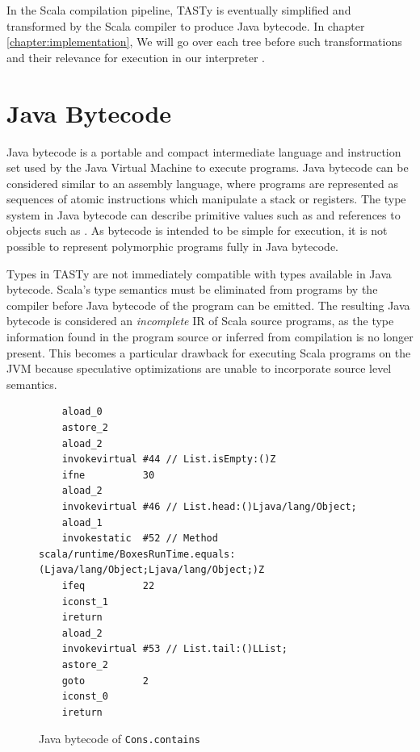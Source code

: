 In the Scala compilation pipeline, TASTy is eventually simplified and transformed by the Scala compiler to produce Java bytecode. 
In chapter \ref{chapter:implementation}, We will go over each tree before such transformations and their relevance for execution in our interpreter .

\section{Java Bytecode}

Java bytecode is a portable and compact intermediate language and instruction set used by the Java Virtual Machine to execute programs.
Java bytecode can be considered similar to an assembly language, where programs are represented as sequences of atomic instructions which manipulate a stack or registers.
The type system in Java bytecode can describe primitive values such as  and references to objects such as .
As bytecode is intended to be simple for execution, it is not possible to represent polymorphic programs fully in Java bytecode.

Types in TASTy are not immediately compatible with types available in Java bytecode.
Scala's type semantics must be eliminated from programs by the compiler before Java bytecode of the program can be emitted.
The resulting Java bytecode is considered an \textit{incomplete} IR of Scala source programs, as the type information found in the program source or inferred from compilation is no longer present.
This becomes a particular drawback for executing Scala programs on the JVM because speculative optimizations are unable to incorporate source level semantics.

\begin{figure}[!htb]
	\begin{verbatim}
	aload_0
 	astore_2
	aload_2
	invokevirtual #44 // List.isEmpty:()Z
	ifne          30
	aload_2
	invokevirtual #46 // List.head:()Ljava/lang/Object;
	aload_1
	invokestatic  #52 // Method scala/runtime/BoxesRunTime.equals:(Ljava/lang/Object;Ljava/lang/Object;)Z
	ifeq          22
	iconst_1
	ireturn
	aload_2
	invokevirtual #53 // List.tail:()LList;
	astore_2
	goto          2
	iconst_0
	ireturn
	\end{verbatim}
	\caption{Java bytecode of \texttt{Cons.contains}}
	\label{example:contains-bytecode}
\end{figure}

